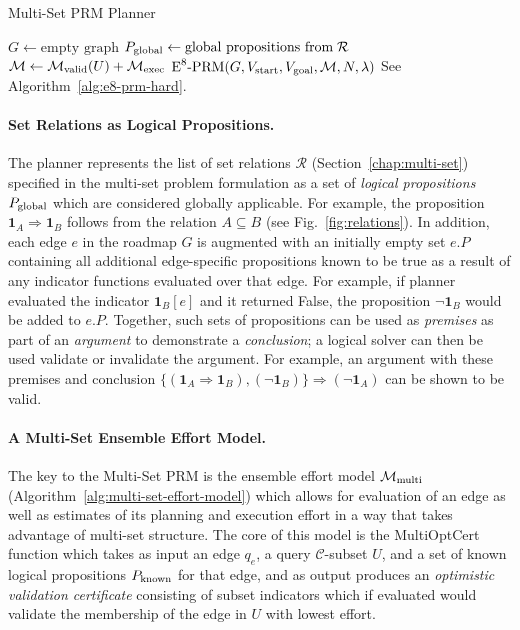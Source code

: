 \begin{algorithm}
\caption{Multi-Set PRM Planner}
\label{alg:multi-set-prm}
\begin{algorithmic}[1]
\State $G \leftarrow \mbox{empty graph}$
\State $P_{\mbox{\scriptsize global}} \leftarrow
   \mbox{global propositions from\;} \mathcal{R}$
\State $\mathcal{M} \leftarrow
   \mathcal{M}_{\mbox{\scriptsize valid}}(U)
   + \mathcal{M}_{\mbox{\scriptsize exec}}$
\State \Return $\mbox{E}^8\mbox{-PRM}(G,
      V_{\mbox{\scriptsize start}}, V_{\mbox{\scriptsize goal}},
      \mathcal{M}, N, \lambda)$
      \Comment See Algorithm~\ref{alg:e8-prm-hard}.
\EndProcedure
\end{algorithmic}
\end{algorithm}

\paragraph{Set Relations as Logical Propositions.}
The planner represents the list of set relations $\mathcal{R}$
(Section~\ref{chap:multi-set})
specified in the multi-set problem formulation
as a set of \emph{logical propositions} $P_{\mbox{\scriptsize global}}$
which are considered globally applicable.
For example,
the proposition $\mathbf{1}_A \Rightarrow \mathbf{1}_B$
follows from the relation $A \subseteq B$
(see Fig.~\ref{fig:relations}).
In addition,
each edge $e$ in the roadmap $G$ is augmented with an initially empty
set $e.P$ containing all additional edge-specific propositions
known to be true as a result of any indicator functions evaluated
over that edge.
For example,
if planner evaluated the indicator $\mathbf{1}_B[e]$
and it returned False,
the proposition $\lnot\mathbf{1}_B$ would be added to $e.P$.
Together, such sets of propositions can be used as \emph{premises}
as part of an \emph{argument} to demonstrate a \emph{conclusion};
a logical solver can then be used validate or invalidate the argument.
For example, an argument with these premises and conclusion
$\{ (\mathbf{1}_A \Rightarrow \mathbf{1}_B), (\lnot\mathbf{1}_B) \}
\Rightarrow (\lnot\mathbf{1}_A)$
can be shown to be valid.

\paragraph{A Multi-Set Ensemble Effort Model.}
The key to the Multi-Set PRM is the ensemble effort model
$\mathcal{M}_{\mbox{\scriptsize multi}}$
(Algorithm~\ref{alg:multi-set-effort-model})
which allows for evaluation of an edge
as well as estimates of its planning and execution effort
in a way that takes advantage of multi-set structure.
The core of this model is the {\sc MultiOptCert} function
which takes as input an edge $q_e$,
a query $\mathcal{C}$-subset $U$,
and a set of known logical propositions $P_{\mbox{\scriptsize known}}$
for that edge,
and as output produces an \emph{optimistic validation certificate}
consisting of subset indicators which if evaluated would
validate the membership of the edge in $U$ with lowest effort.

